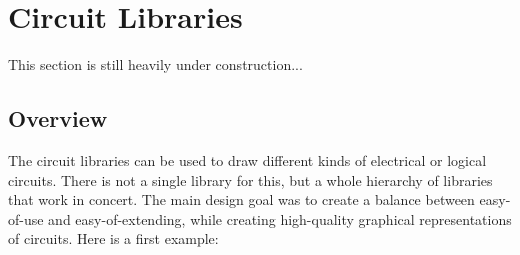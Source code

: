 %
%
%



\section{Circuit Libraries}
\label{section-library-circuits}

This section is still heavily under construction...

\subsection{Overview}

The circuit libraries can be used to draw different kinds of
electrical or logical circuits. There is not a single library for
this, but a whole hierarchy of libraries that work in concert. The
main design goal was to create a balance between easy-of-use and
easy-of-extending, while creating high-quality graphical
representations of circuits. Here is a first example:

